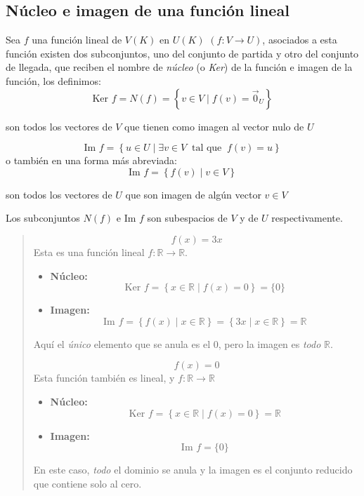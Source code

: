 \subsection{Núcleo e imagen de una función lineal}

Sea \(f\) una función lineal de \(V(K)\) en \(U(K)\) \(\left(f:V\rightarrow U\right)\), asociados a esta función existen dos subconjuntos, uno del conjunto de partida y otro del conjunto de llegada, que reciben el nombre de \textit{núcleo} (o \textit{Ker}) de la función e imagen de la función, los definimos:
\[
\text{Ker } f = N(f) = \left\{ v \in V \mid f(v) = \vec{0}_U \right\}
\]
\begin{center}
  son todos los vectores de \(V\) que tienen como imagen al vector nulo de \(U\)
\end{center}
\[
\text{Im } f = \left\{u\in U \mid \exists v \in V ~\text{ tal que }~ f(v) = u \right\}
\]
o también en una forma más abreviada:
\[
\text{Im } f = \left\{f(v) \mid v \in V\right\}
\]
\begin{center}
  son todos los vectores de \(U\) que son imagen de algún vector \(v \in V\)
\end{center}

Los subconjuntos \(N(f)\) e \(\text{Im } f\) son subespacios de \(V\) y de \(U\) respectivamente.

\begin{quote}
  \[
    f(x) = 3x
  \]
  Esta es una función lineal \(f:\mathbb{R} \rightarrow \mathbb{R}\).
  \begin{itemize}
    \item \textbf{Núcleo:}
    \[
      \text{Ker } f = \left\{x \in \mathbb{R} \mid f(x) = 0\right\} = \{0\}
    \]
    \item \textbf{Imagen:}
    \[
      \text{Im } f = \left\{f(x) \mid x \in \mathbb{R}\right\} = \left\{3x \mid x \in \mathbb{R}\right\} = \mathbb{R}
    \]
  \end{itemize}
  Aquí el \textit{único} elemento que se anula es el \(0\), pero la imagen es \textit{todo} \(\mathbb{R}\).

  \vspace{5mm}

  \[
    f(x) = 0
  \]
  Esta función también es lineal, y \(f:\mathbb{R} \rightarrow \mathbb{R}\)
  \begin{itemize}
    \item \textbf{Núcleo:}
    \[
      \text{Ker } f = \left\{x \in \mathbb{R} \mid f(x) = 0\right\} = \mathbb{R}
    \]
    \item \textbf{Imagen:}
    \[
      \text{Im } f = \{0\}
    \]
  \end{itemize}
  En este caso, \textit{todo} el dominio se anula y la imagen es el conjunto reducido que contiene solo al cero.
\end{quote}


